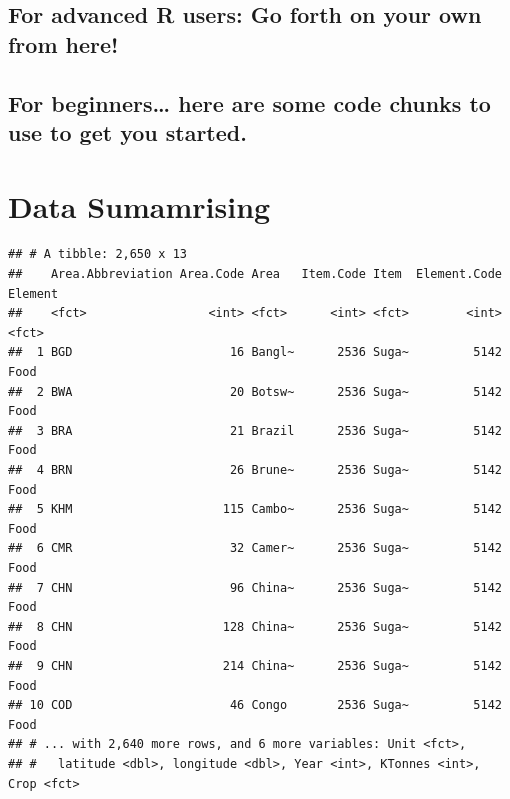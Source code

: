 \documentclass[]{article}
\newenvironment{Shaded}{\begin{snugshade}}{\end{snugshade}}
\newcommand{\KeywordTok}[1]{\textcolor[rgb]{0.13,0.29,0.53}{\textbf{{#1}}}}
\newcommand{\StringTok}[1]{\textcolor[rgb]{0.31,0.60,0.02}{{#1}}}
\newcommand{\CommentTok}[1]{\textcolor[rgb]{0.56,0.35,0.01}{\textit{{#1}}}}
\newcommand{\NormalTok}[1]{{#1}}
\begin{document}
\subsection{For advanced R users: Go forth on your own from
here!}\label{for-advanced-r-users-go-forth-on-your-own-from-here}

\subsection{For beginners\ldots{} here are some code chunks to use to
get you
started.}\label{for-beginners-here-are-some-code-chunks-to-use-to-get-you-started.}

\section{Data Sumamrising}\label{data-sumamrising}

\begin{Shaded}
\end{Shaded}

\begin{verbatim}
## # A tibble: 2,650 x 13
##    Area.Abbreviation Area.Code Area   Item.Code Item  Element.Code Element
##    <fct>                 <int> <fct>      <int> <fct>        <int> <fct>  
##  1 BGD                      16 Bangl~      2536 Suga~         5142 Food   
##  2 BWA                      20 Botsw~      2536 Suga~         5142 Food   
##  3 BRA                      21 Brazil      2536 Suga~         5142 Food   
##  4 BRN                      26 Brune~      2536 Suga~         5142 Food   
##  5 KHM                     115 Cambo~      2536 Suga~         5142 Food   
##  6 CMR                      32 Camer~      2536 Suga~         5142 Food   
##  7 CHN                      96 China~      2536 Suga~         5142 Food   
##  8 CHN                     128 China~      2536 Suga~         5142 Food   
##  9 CHN                     214 China~      2536 Suga~         5142 Food   
## 10 COD                      46 Congo       2536 Suga~         5142 Food   
## # ... with 2,640 more rows, and 6 more variables: Unit <fct>,
## #   latitude <dbl>, longitude <dbl>, Year <int>, KTonnes <int>, Crop <fct>
\end{verbatim}
\end{document}
